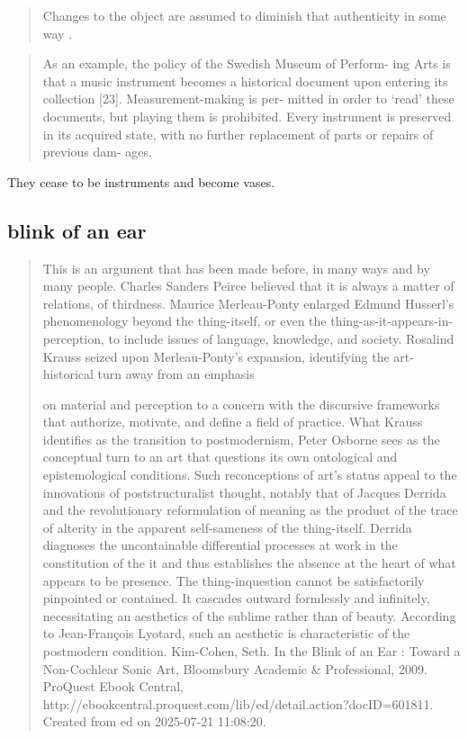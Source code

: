 \begin{quotation}
Changes to the object are assumed to diminish that authenticity in some way
\cite{laurenson_authenticity_2006}.    
\end{quotation}

\begin{quotation}
As an example, the policy of the Swedish Museum of Perform- ing Arts is that a
music instrument becomes a historical document upon entering its collection
[23]. Measurement-making is per- mitted in order to ‘read’ these documents, but
playing them is prohibited. Every instrument is preserved in its acquired state,
with no further replacement of parts or repairs of previous dam- ages.
\end{quotation}
They cease to be instruments and become vases.


\subsection{blink of an ear}

\begin{quotation}

This is an argument that has been made before, in many ways and by many people.
Charles Sanders Peirce believed that it is always a matter of relations, of
thirdness. Maurice Merleau-Ponty enlarged Edmund Husserl’s phenomenology beyond
the thing-itself, or even the thing-as-it-appears-in-perception, to include
issues of language, knowledge, and society. Rosalind Krauss seized upon
Merleau-Ponty’s expansion, identifying the art-historical turn away from an
emphasis

on material and perception to a concern with the discursive frameworks that
authorize, motivate, and define a field of practice. What Krauss identifies as
the transition to postmodernism, Peter Osborne sees as the conceptual turn to an
art that questions its own ontological and epistemological conditions. Such
reconceptions of art’s status appeal to the innovations of poststructuralist
thought, notably that of Jacques Derrida and the revolutionary reformulation of
meaning as the product of the trace of alterity in the apparent self-sameness of
the thing-itself. Derrida diagnoses the uncontainable differential processes at
work in the constitution of the it and thus establishes the absence at the heart
of what appears to be presence. The thing-inquestion cannot be satisfactorily
pinpointed or contained. It cascades outward formlessly and infinitely,
necessitating an aesthetics of the sublime rather than of beauty. According to
Jean-François Lyotard, such an aesthetic is characteristic of the postmodern
condition. Kim-Cohen, Seth. In the Blink of an Ear : Toward a Non-Cochlear Sonic
Art, Bloomsbury Academic \& Professional, 2009. ProQuest Ebook Central,
http://ebookcentral.proquest.com/lib/ed/detail.action?docID=601811. Created from
ed on 2025-07-21 11:08:20.

\end{quotation}


